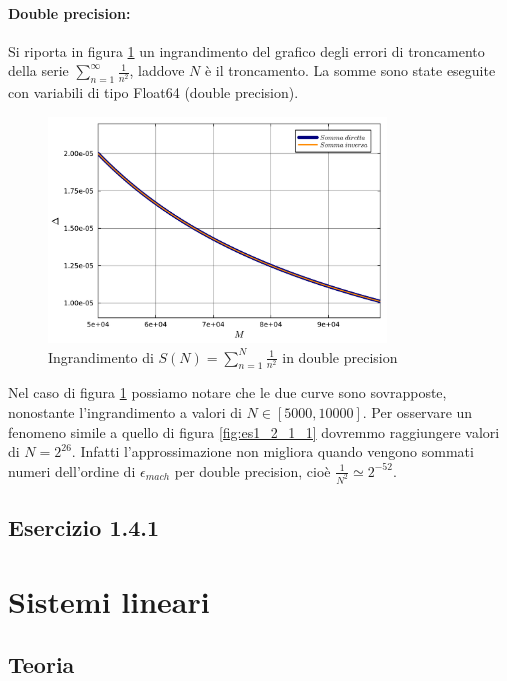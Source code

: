 \documentclass[letterpaper, 12pt]{article}
\begin{document}
\paragraph{Double precision:}

Si riporta in figura \ref{fig:es1_2_1_2} un ingrandimento del grafico degli errori di troncamento della serie 
$\sum_{n=1}^\infty \frac{1}{n^2}$, laddove $N$ è il troncamento. La somme sono state eseguite
con variabili di tipo Float64 (double precision).

\begin{figure}[ht!]
    \centering
    \includegraphics[width=0.8\textwidth]{1212.pdf}
    \caption{Ingrandimento di $S(N)=\sum_{n=1}^N \frac{1}{n^2}$ in double precision}
    \label{fig:es1_2_1_2}
\end{figure}

Nel caso di figura \ref{fig:es1_2_1_2} possiamo notare che le due curve sono sovrapposte, nonostante l'ingrandimento a 
valori di $N \in [5000, 10000]$. Per osservare un fenomeno simile a quello di 
figura \ref{fig:es1_2_1_1} dovremmo raggiungere valori di $N = 2^{26}$. Infatti l'approssimazione non migliora
quando vengono sommati numeri dell'ordine di $\epsilon_{mach}$ per double precision, cioè
 $\frac{1}{N^2} \simeq 2^{-52}$.

\subsection{Esercizio 1.4.1}

\section{Sistemi lineari}
\label{sistemi_lineari}
\subsection{Teoria}
\end{document}
